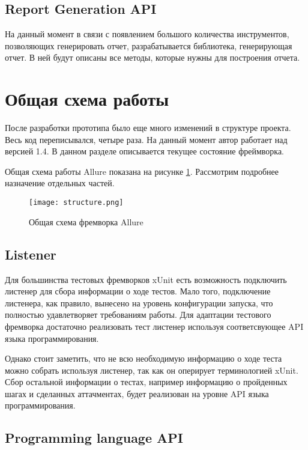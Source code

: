 \subsection{Report Generation API}

На данный момент в связи с появлением большого количества инструментов, позволяющих генерировать отчет, разрабатывается библиотека, генерирующая отчет. В ней будут описаны все методы, которые нужны для построения отчета. 

\section{Общая схема работы} 

После разработки прототипа было еще много изменений в структуре проекта. Весь код переписывался, четыре раза. На данный момент автор работает над версией 1.4. В данном разделе описывается текущее состояние фреймворка.

Общая схема работы Allure показана на рисунке \ref{fig:allure}. Рассмотрим подробнее назначение отдельных частей.

\begin{figure}[htb]
\centering
\texttt{[image: structure.png]}
\caption{Общая схема фремворка Allure}
\label{fig:allure}
\end{figure}

\subsection{Listener}

Для большинства тестовых фремворков xUnit есть возможность подключить листенер для сбора информации о ходе тестов. Мало того, подключение листенера, как правило, вынесено на уровень конфигурации запуска, что полностью удавлетворяет требованиям работы. Для адаптации тестового фремворка достаточно реализовать тест листенер используя соответсвующее API языка программирования.

Однако стоит заметить, что не всю необходимую информацию о ходе теста можно собрать используя листенер, так как он оперирует терминологией xUnit. Сбор остальной информации о тестах, например информацию о пройденных шагах и сделанных аттачментах, будет реализован на уровне API языка программирования.

\subsection{Programming language API}

